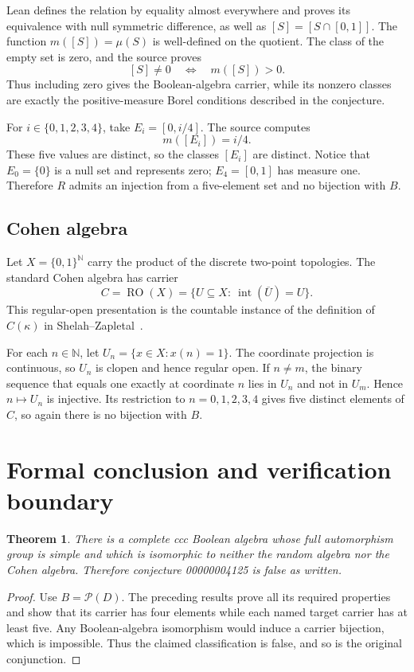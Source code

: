 \documentclass[11pt]{article}
\newcommand{\RO}{\operatorname{RO}}
\newcommand{\interior}{\operatorname{int}}
\newtheorem{theorem}{Theorem}
\begin{document}
Lean defines the relation by equality almost everywhere and proves its equivalence with null symmetric difference, as well as $[S]=[S\cap[0,1]]$. The function $m([S])=\mu(S)$ is well-defined on the quotient. The class of the empty set is zero, and the source proves
\[
[S]\ne 0\quad\Longleftrightarrow\quad m([S])>0.
\]
Thus including zero gives the Boolean-algebra carrier, while its nonzero classes are exactly the positive-measure Borel conditions described in the conjecture.

For $i\in\{0,1,2,3,4\}$, take $E_i=[0,i/4]$. The source computes
\[
m([E_i])=i/4.
\]
These five values are distinct, so the classes $[E_i]$ are distinct. Notice that $E_0=\{0\}$ is a null set and represents zero; $E_4=[0,1]$ has measure one. Therefore $R$ admits an injection from a five-element set and no bijection with $B$.

\subsection{Cohen algebra}
Let $X=\{0,1\}^{\mathbb N}$ carry the product of the discrete two-point topologies. The standard Cohen algebra has carrier
\[
C=\RO(X)=\{U\subseteq X:\ \interior(\overline U)=U\}.
\]
This regular-open presentation is the countable instance of the definition of $C(\kappa)$ in Shelah--Zapletal~\cite{SZ}.

For each $n\in\mathbb N$, let $U_n=\{x\in X:x(n)=1\}$. The coordinate projection is continuous, so $U_n$ is clopen and hence regular open. If $n\ne m$, the binary sequence that equals one exactly at coordinate $n$ lies in $U_n$ and not in $U_m$. Hence $n\mapsto U_n$ is injective. Its restriction to $n=0,1,2,3,4$ gives five distinct elements of $C$, so again there is no bijection with $B$.

\section{Formal conclusion and verification boundary}
\begin{theorem}
There is a complete ccc Boolean algebra whose full automorphism group is simple and which is isomorphic to neither the random algebra nor the Cohen algebra. Therefore conjecture 00000004125 is false as written.
\end{theorem}
\begin{proof}
Use $B=\mathcal P(D)$. The preceding results prove all its required properties and show that its carrier has four elements while each named target carrier has at least five. Any Boolean-algebra isomorphism would induce a carrier bijection, which is impossible. Thus the claimed classification is false, and so is the original conjunction.
\end{proof}
\end{document}
